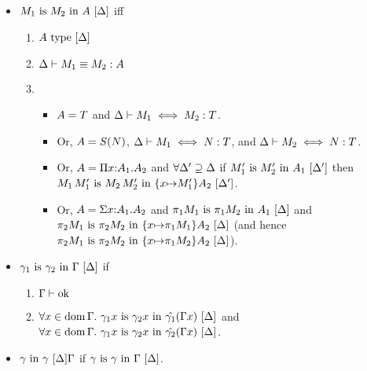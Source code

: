 \documentclass{article}
\theoremstyle{break}
\newcommand{\dom}{\mathop{\mathrm{dom}}}
\newcommand{\env}{\gamma}
\newcommand{\envone}{\hat{\env_1}}
\newcommand{\envtwo}{\hat{\env_2}}
\begin{document}
\begin{itemize}
\goodbreak
\item $\semanticequivterm{\world}{\constructor_1}{\constructor_2}{\kind}$ iff
\begin{enumerate}
\item $\semanticvalidtype{\world}{\kind}$
\item $\equivconstructor{\world}{\constructor_1}{\constructor_2}{\kind}$
\item
\begin{itemize}{}
\item $\kind = \ktype$ and 
$\aconequiv{\world}{\constructor_1}{\constructor_2}{\ktype}$.
\item Or, $\kind = \ksingleton{\otherconstructor}$,
$\aconequiv{\world}{\constructor_1}{\otherconstructor}{\ktype}$, and
$\aconequiv{\world}{\constructor_2}{\otherconstructor}{\ktype}$.
\item Or, $\kind = \kpi{\cvar}{\kind_1}{\kind_2}$ and
$\forall \world'\supseteq\world$ if $\semanticequivterm{\world'}{\constructor'_1}{\constructor'_2}{\kind_1}$
then $\semanticequivterm{\world'}{\capply{\constructor_1}{\constructor'_1}}
 {\capply{\constructor_2}{\constructor'_2}}{\substitute{\cvar}{\constructor'_1}{\kind_2}}$.
\item Or, $\kind = \ksigma{\cvar}{\kind_1}{\kind_2}$ and
$\semanticequivterm{\world}{\cpi{1}{\constructor_1}}{\cpi{1}{\constructor_2}}{\kind_1}$ and
$\semanticequivterm{\world}{\cpi{2}{\constructor_1}}{\cpi{2}{\constructor_2}}{\substitute{\cvar}{\cpi{1}{\constructor_1}}{\kind_2}}$
(and hence 
$\semanticequivterm{\world}{\cpi{2}{\constructor_1}}{\cpi{2}{\constructor_2}}{\substitute{\cvar}{\cpi{1}{\constructor_2}}{\kind_2}}$).
\end{itemize}
\end{enumerate}


\item $\semanticequivenv{\world}{\env_1}{\env_2}{\context}$ if 
\begin{enumerate}
\item $\validcontext{\context}$
\item 
$\forall \cvar\in\dom\context.\ \semanticequivterm{\world}{\env_1\cvar}{\env_2\cvar}{\envone(\context\cvar)}$ and
$\forall \cvar\in\dom\context.\ \semanticequivterm{\world}{\env_1\cvar}{\env_2\cvar}{\envtwo(\context\cvar)}$.
\end{enumerate}
\item $\semanticvalidenv{\world}{\env}{\env}{\context}$ if
$\semanticequivenv{\world}{\env}{\env}{\context}$.

\end{itemize}
\end{document}

